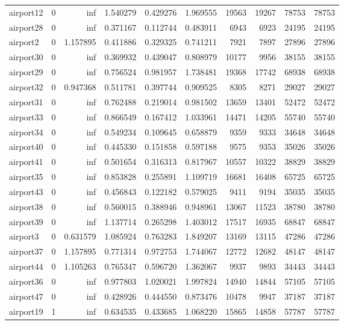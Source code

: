 \begin{longtable}{|l|r|r|r|r|r|r|r|r|r|}
airport12 & 0 & inf & 1.540279 & 0.429276 & 1.969555 & 19563 & 19267 & 78753 & 78753 \\
airport28 & 0 & inf & 0.371167 & 0.112744 & 0.483911 & 6943 & 6923 & 24195 & 24195 \\
airport2 & 0 & 1.157895 & 0.411886 & 0.329325 & 0.741211 & 7921 & 7897 & 27896 & 27896 \\
airport30 & 0 & inf & 0.369932 & 0.439047 & 0.808979 & 10177 & 9956 & 38155 & 38155 \\
airport29 & 0 & inf & 0.756524 & 0.981957 & 1.738481 & 19368 & 17742 & 68938 & 68938 \\
airport32 & 0 & 0.947368 & 0.511781 & 0.397744 & 0.909525 & 8305 & 8271 & 29027 & 29027 \\
airport31 & 0 & inf & 0.762488 & 0.219014 & 0.981502 & 13659 & 13401 & 52472 & 52472 \\
airport33 & 0 & inf & 0.866549 & 0.167412 & 1.033961 & 14471 & 14205 & 55740 & 55740 \\
airport34 & 0 & inf & 0.549234 & 0.109645 & 0.658879 & 9359 & 9333 & 34648 & 34648 \\
airport40 & 0 & inf & 0.445330 & 0.151858 & 0.597188 & 9575 & 9353 & 35026 & 35026 \\
airport41 & 0 & inf & 0.501654 & 0.316313 & 0.817967 & 10557 & 10322 & 38829 & 38829 \\
airport35 & 0 & inf & 0.853828 & 0.255891 & 1.109719 & 16681 & 16408 & 65725 & 65725 \\
airport43 & 0 & inf & 0.456843 & 0.122182 & 0.579025 & 9411 & 9194 & 35035 & 35035 \\
airport38 & 0 & inf & 0.560015 & 0.388946 & 0.948961 & 13067 & 11523 & 38780 & 38780 \\
airport39 & 0 & inf & 1.137714 & 0.265298 & 1.403012 & 17517 & 16935 & 68847 & 68847 \\
airport3 & 0 & 0.631579 & 1.085924 & 0.763283 & 1.849207 & 13169 & 13115 & 47286 & 47286 \\
airport37 & 0 & 1.157895 & 0.771314 & 0.972753 & 1.744067 & 12772 & 12682 & 48147 & 48147 \\
airport44 & 0 & 1.105263 & 0.765347 & 0.596720 & 1.362067 & 9937 & 9893 & 34443 & 34443 \\
airport36 & 0 & inf & 0.977803 & 1.020021 & 1.997824 & 14940 & 14844 & 57105 & 57105 \\
airport47 & 0 & inf & 0.428926 & 0.444550 & 0.873476 & 10478 & 9947 & 37187 & 37187 \\
airport19 & 1 & inf & 0.634535 & 0.433685 & 1.068220 & 15865 & 14858 & 57787 & 57787 \\

\end{longtable}
